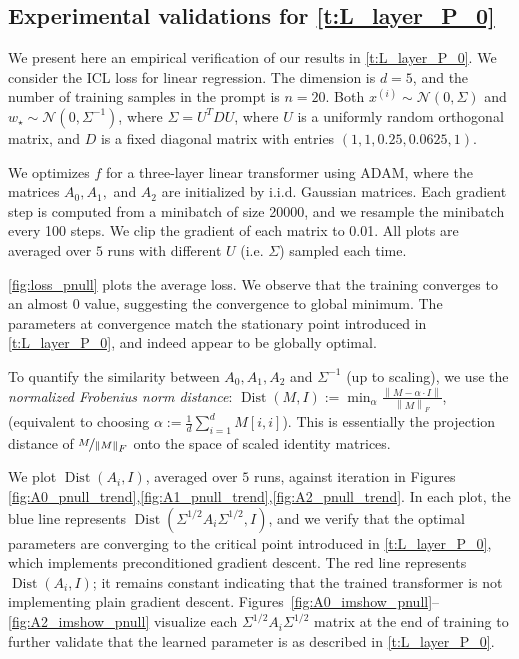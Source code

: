 \documentclass{article}
\DeclareMathOperator{\Dist}{Dist}
\newcommand{\wstar}{w_\star}
\newcommand{\tx}[1]{x^{(#1)}}
\newcommand*\lrn[1]{\left\| #1 \right\|}
\newcommand*\lrp[1]{\left( #1 \right)}
\begin{document}
\subsection{Experimental validations for \autoref{t:L_layer_P_0}}
\label{s:experiment_pnull}
We present here an empirical verification of our results in \autoref{t:L_layer_P_0}. We consider the ICL loss for linear regression. The dimension is $d=5$, and the number of training samples in the prompt is $n=20$. Both $\tx{i}\sim \mathcal{N}(0,\Sigma)$ and $\wstar \sim \mathcal{N}(0,\Sigma^{-1})$, where $\Sigma = U^T D U$, where $U$ is a uniformly random orthogonal matrix, and $D$ is a fixed diagonal matrix with entries $(1,1,0.25,0.0625,1)$. 

We optimizes $f$ for a three-layer linear transformer using ADAM, where the matrices $A_0,A_1,$ and $A_2$ are initialized by i.i.d. Gaussian matrices. Each gradient step is computed from a minibatch of size 20000, and we resample the minibatch every 100 steps. We clip the gradient of each matrix to 0.01. All plots are averaged over $5$ runs with different $U$ (i.e. $\Sigma$) sampled each time.

\autoref{fig:loss_pnull} plots the average loss. We observe that the training converges to an almost $0$ value, suggesting the convergence to global minimum. The parameters at convergence match the stationary point introduced in \autoref{t:L_layer_P_0}, and indeed appear to be globally optimal. 

To quantify the similarity between $A_0,A_1,A_2$ and $\Sigma^{-1}$ (up to scaling), we use the \emph{normalized Frobenius norm distance}: $\Dist(M,I) := \min_{\alpha}  \frac{\lrn{M - \alpha  \cdot I}}{\lrn{M}_F}$, (equivalent to choosing $\alpha := \frac{1}{d} \sum_{i=1}^d M[i,i]$). This is essentially the projection distance of $\nicefrac{M}{\lrn{M}}_F$ onto the space of scaled identity matrices. 

We plot $\Dist\lrp{A_i, I}$, averaged over $5$ runs, against iteration in Figures \ref{fig:A0_pnull_trend},\ref{fig:A1_pnull_trend},\ref{fig:A2_pnull_trend}. In each plot, the blue line represents $\Dist(\Sigma^{1/2} A_i \Sigma^{1/2},I)$, and we verify that the optimal parameters are converging to the critical point introduced in \autoref{t:L_layer_P_0}, which implements preconditioned gradient descent. The red line  represents $\Dist(A_i,I)$; it remains constant indicating that the trained transformer is not implementing plain gradient descent.  Figures~\ref{fig:A0_imshow_pnull}--\ref{fig:A2_imshow_pnull} visualize each $\Sigma^{1/2} A_i \Sigma^{1/2}$ matrix at the end of training to further validate that the learned parameter is as described in \autoref{t:L_layer_P_0}.
\end{document}
